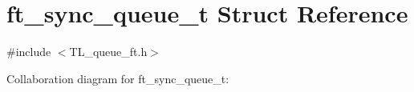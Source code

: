 \hypertarget{structft__sync__queue__t}{}\section{ft\+\_\+sync\+\_\+queue\+\_\+t Struct Reference}
\label{structft__sync__queue__t}


{\ttfamily \#include $<$T\+L\+\_\+queue\+\_\+ft.\+h$>$}



Collaboration diagram for ft\+\_\+sync\+\_\+queue\+\_\+t\+:
